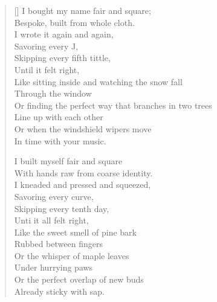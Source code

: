 \begin{verse}[\textwidth]
I bought my name fair and square;\\
Bespoke, built from whole cloth.\\
I wrote it again and again,\\
Savoring every J,\\
Skipping every fifth tittle,\\
Until it felt right,\\
Like sitting inside and watching the snow fall\\
\vin Through the window\\
Or finding the perfect way that branches in two trees\\
\vin Line up with each other\\
Or when the windshield wipers move\\
\vin In time with your music.

I built myself fair and square\\
With hands raw from coarse identity.\\
I kneaded and pressed and squeezed,\\
Savoring every curve,\\
Skipping every tenth day,\\
Unti it all felt right,\\
Like the sweet smell of pine bark\\
\vin Rubbed between fingers\\
Or the whisper of maple leaves\\
\vin Under hurrying paws\\
Or the perfect overlap of new buds\\
\vin Already sticky with sap.
\end{verse}
